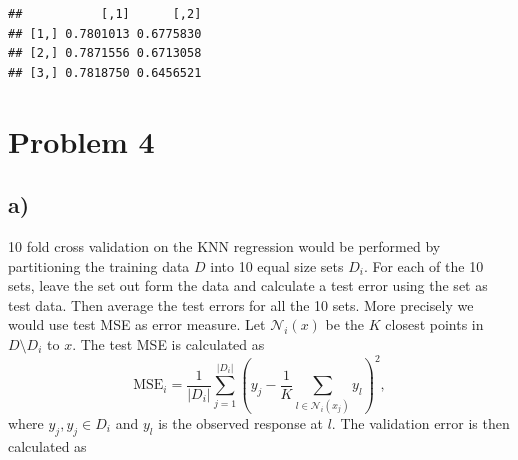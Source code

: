 \documentclass[
]{article}
\newenvironment{Shaded}{\begin{snugshade}}{\end{snugshade}}
\newcommand{\CommentTok}[1]{\textcolor[rgb]{0.56,0.35,0.01}{\textit{#1}}}
\newcommand{\DataTypeTok}[1]{\textcolor[rgb]{0.13,0.29,0.53}{#1}}
\newcommand{\DecValTok}[1]{\textcolor[rgb]{0.00,0.00,0.81}{#1}}
\newcommand{\KeywordTok}[1]{\textcolor[rgb]{0.13,0.29,0.53}{\textbf{#1}}}
\newcommand{\NormalTok}[1]{#1}
\newcommand{\OperatorTok}[1]{\textcolor[rgb]{0.81,0.36,0.00}{\textbf{#1}}}
\newcommand{\StringTok}[1]{\textcolor[rgb]{0.31,0.60,0.02}{#1}}
\begin{document}
\begin{Shaded}
\end{Shaded}

\begin{verbatim}
##           [,1]      [,2]
## [1,] 0.7801013 0.6775830
## [2,] 0.7871556 0.6713058
## [3,] 0.7818750 0.6456521
\end{verbatim}

\hypertarget{problem-4}{%
\section{Problem 4}\label{problem-4}}

\hypertarget{a-3}{%
\subsection{a)}\label{a-3}}

10 fold cross validation on the KNN regression would be performed by
partitioning the training data \(D\) into 10 equal size sets \(D_i\).
For each of the 10 sets, leave the set out form the data and calculate a
test error using the set as test data. Then average the test errors for
all the 10 sets. More precisely we would use test MSE as error measure.
Let \(\mathcal{N}_i (x)\) be the \(K\) closest points in
\(D \setminus D_i\) to \(x\). The test MSE is calculated as \[
\mathrm{MSE}_{i}=\frac{1}{|D_i|}\sum^{|D_i|}_{j=1}{(y_j-\frac{1}{K}\sum_{l\in \mathcal{N}_i(x_j)}{y_l} )^2 },
\] where \(y_j,y_j \in D_i\) and \(y_l\) is the observed response at
\(l\). The validation error is then calculated as
\end{document}
